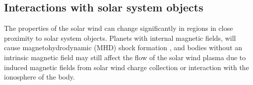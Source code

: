 
\subsection*{Interactions with solar system objects}
The properties of the solar wind can change significantly in regions in close proximity to solar system objects. Planets with internal magnetic fields, will cause magnetohydrodynamic (MHD) shock formation , and bodies without an intrinsic magnetic field may still affect the flow of the solar wind plasma due to induced magnetic fields from solar wind charge collection or interaction with the ionosphere of the body.

